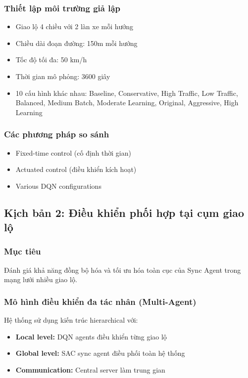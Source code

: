 \subsubsection{Thiết lập môi trường giả lập}
\begin{itemize}
    \item Giao lộ 4 chiều với 2 làn xe mỗi hướng

    \item Chiều dài đoạn đường: 150m mỗi hướng

    \item Tốc độ tối đa: 50 km/h

    \item Thời gian mô phỏng: 3600 giây

    \item 10 cấu hình khác nhau: Baseline, Conservative, High Traffic, Low Traffic,
        Balanced, Medium Batch, Moderate Learning, Original, Aggressive, High Learning
\end{itemize}

\subsubsection{Các phương pháp so sánh}
\begin{itemize}
    \item Fixed-time control (cố định thời gian)

    \item Actuated control (điều khiển kích hoạt)

    \item Various DQN configurations
\end{itemize}

\subsection{Kịch bản 2: Điều khiển phối hợp tại cụm giao lộ}
\subsubsection{Mục tiêu}
Đánh giá khả năng đồng bộ hóa và tối ưu hóa toàn cục của Sync Agent trong mạng lưới
nhiều giao lộ.

\subsubsection{Mô hình điều khiển đa tác nhân (Multi-Agent)}
Hệ thống sử dụng kiến trúc hierarchical với:
\begin{itemize}
    \item \textbf{Local level:} DQN agents điều khiển từng giao lộ

    \item \textbf{Global level:} SAC sync agent điều phối toàn hệ thống

    \item \textbf{Communication:} Central server làm trung gian
\end{itemize}

